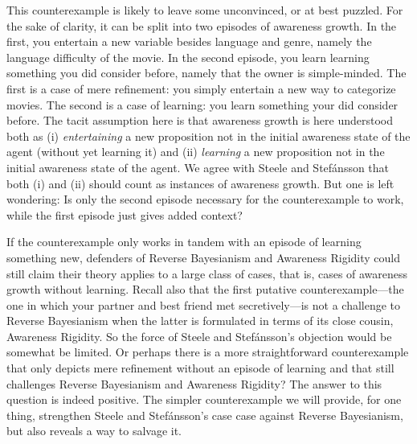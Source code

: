 \documentclass[
  11pt,
  dvipsnames,enabledeprecatedfontcommands]{scrartcl}
\begin{document}
This counterexample is likely to leave some unconvinced, or at best
puzzled. For the sake of clarity, it can be split into two episodes of
awareness growth. In the first, you entertain a new variable besides
language and genre, namely the language difficulty of the movie. In the
second episode, you learn learning something you did consider before,
namely that the owner is simple-minded. The first is a case of mere
refinement: you simply entertain a new way to categorize movies. The
second is a case of learning: you learn something your did consider
before. The tacit assumption here is that awareness growth is here
understood both as (i) \textit{entertaining} a new proposition not in
the initial awareness state of the agent (without yet learning it) and
(ii) \textit{learning} a new proposition not in the initial awareness
state of the agent. We agree with Steele and Stefánsson that both (i)
and (ii) should count as instances of awareness growth. But one is left
wondering: Is only the second episode necessary for the counterexample
to work, while the first episode just gives added context?

If the counterexample only works in tandem with an episode of learning
something new, defenders of Reverse Bayesianism and Awareness Rigidity
could still claim their theory applies to a large class of cases, that
is, cases of awareness growth without learning. Recall also that the
first putative counterexample---the one in which your partner and best
friend met secretively---is not a challenge to Reverse Bayesianism when
the latter is formulated in terms of its close cousin, Awareness
Rigidity. So the force of Steele and Stefánsson's objection would be
somewhat be limited. Or perhaps there is a more straightforward
counterexample that only depicts mere refinement without an episode of
learning and that still challenges Reverse Bayesianism and Awareness
Rigidity? The answer to this question is indeed positive. The simpler
counterexample we will provide, for one thing, strengthen Steele and
Stefánsson's case case against Reverse Bayesianism, but also reveals a
way to salvage it.
\end{document}
